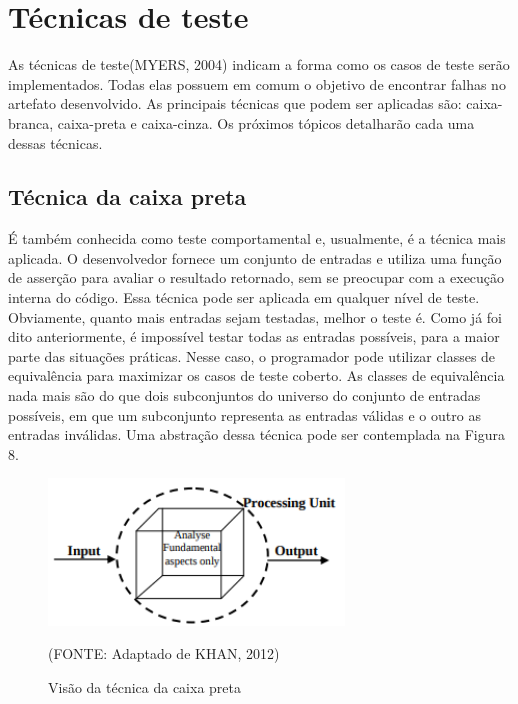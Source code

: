 \documentclass[
    12pt,       %
    openright,      %
    twoside,      %
    a4paper,      %
    english,      %
    french,       %
    spanish,      %
    brazil,       %
    ]{abntex2}
\begin{document}
      \section{Técnicas de teste}
          As técnicas de teste(MYERS, 2004) indicam a forma como os casos de teste serão implementados.
          Todas elas possuem em comum o objetivo de  encontrar falhas no artefato desenvolvido.
          As principais técnicas que podem ser aplicadas são: caixa-branca, caixa-preta e caixa-cinza.
          Os próximos tópicos detalharão cada uma dessas técnicas.

          \subsection{Técnica da caixa preta}
              É também conhecida como teste comportamental e, usualmente, é a técnica mais aplicada.
              O desenvolvedor fornece um conjunto de entradas e utiliza uma função de asserção
              para avaliar o resultado retornado, sem se preocupar com a execução interna do código.
              Essa técnica pode ser aplicada em qualquer nível de teste. Obviamente, quanto mais
              entradas sejam testadas, melhor o teste é. Como já foi dito anteriormente, é
              impossível testar todas as entradas possíveis, para a maior parte das situações práticas. Nesse caso, o programador pode utilizar
              classes de equivalência para maximizar os casos de teste coberto. As classes de equivalência
              nada mais são do que dois subconjuntos do universo do conjunto de entradas possíveis,
              em que um subconjunto representa as entradas válidas e o outro as entradas inválidas.
              Uma abstração dessa técnica pode ser contemplada na Figura 8.

              \begin{figure}[htbp]
                  \begin{center}
                      \includegraphics[width=0.7\textwidth]{img/blackbox.png}
                  \end{center}
              \caption{\label{fig:passaro}Visão da técnica da caixa preta}
              \begin{center}(FONTE: Adaptado de KHAN, 2012)\end{center}
              \end{figure}
\end{document}

